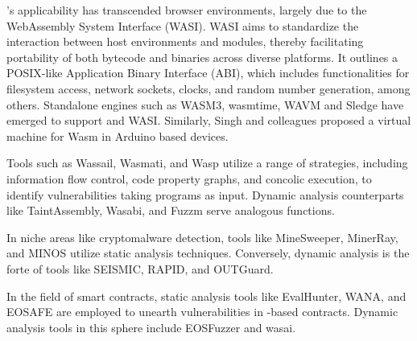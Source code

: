  \Wasm's applicability has transcended browser environments, largely due to the WebAssembly System Interface (WASI)\cite{WASI}. 
WASI aims to standardize the interaction between host environments and \Wasm modules, thereby facilitating portability of both bytecode and binaries across diverse platforms. 
It outlines a POSIX-like Application Binary Interface (ABI), which includes functionalities for filesystem access, network sockets, clocks, and random number generation, among others. 
Standalone engines such as WASM3\cite{wasm3}, wasmtime\cite{wasmtime}, WAVM\cite{WAVM} and Sledge \cite{Sledge} have emerged to support \Wasm and WASI.
Similarly, Singh and colleagues \cite{WARDuino2019} proposed a virtual machine for Wasm in Arduino based devices.




 \cite{WasmA}

 Tools such as Wassail\cite{wassail}, Wasmati\cite{wasmati}, and Wasp\cite{Wasp} utilize a range of strategies, including information flow control, code property graphs, and concolic execution, to identify vulnerabilities taking \wasm programs as input. 
Dynamic analysis counterparts like TaintAssembly\cite{taintassembly}, Wasabi\cite{wasabi}, and Fuzzm\cite{fuzzm} serve analogous functions.

 In niche areas like cryptomalware detection, tools like MineSweeper\cite{Minesweeper}, MinerRay\cite{MinerRay}, and MINOS\cite{MINOS} utilize static analysis techniques. 
Conversely, dynamic analysis is the forte of tools like SEISMIC\cite{SEISMIC}, RAPID\cite{RAPID}, and OUTGuard\cite{outguard}.

 In the field of smart contracts, static analysis tools like EvalHunter\cite{evalhunter}, WANA\cite{wana}, and EOSAFE\cite{eosafe} are employed to unearth vulnerabilities in \Wasm-based contracts. Dynamic analysis tools in this sphere include EOSFuzzer\cite{eosfuzzer} and wasai\cite{wasai}.


